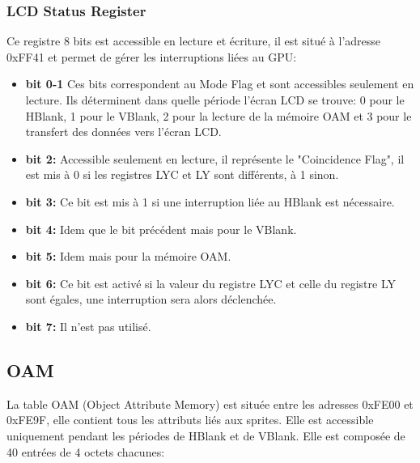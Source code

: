 \documentclass{report}
\begin{document}
\subsubsection{LCD Status Register}
Ce registre 8 bits est accessible en lecture et écriture, il est situé à l'adresse 0xFF41 et permet de gérer les interruptions liées au GPU:\\

\begin{itemize}
\item \textbf{bit 0-1}
	Ces bits correspondent au Mode Flag et sont accessibles seulement en lecture. Ils déterminent dans quelle période l'écran LCD se trouve: 0 pour le HBlank, 1 pour le VBlank, 2 pour la lecture de la mémoire OAM et 3 pour le transfert des données vers l'écran LCD.\\
\item \textbf{bit 2:}
	Accessible seulement en lecture, il représente le "Coincidence Flag", il est mis à 0 si les registres LYC et LY sont différents, à 1 sinon.\\
\item \textbf{bit 3:}
	Ce bit est mis à 1 si une interruption liée au HBlank est nécessaire.\\
\item \textbf{bit 4:} 
	Idem que le bit précédent mais pour le VBlank.\\
\item \textbf{bit 5:}
	Idem mais pour la mémoire OAM.\\
\item \textbf{bit 6:}
	Ce bit est activé si la valeur du registre LYC et celle du registre LY sont égales, une interruption sera alors déclenchée.\\
\item \textbf{bit 7:}
	Il n'est pas utilisé.\\
\end{itemize}

\subsection{OAM}
	La table OAM (Object Attribute Memory) est située entre les adresses 0xFE00 et 0xFE9F, elle contient tous les attributs liés aux sprites. Elle est accessible uniquement pendant les périodes de HBlank et de VBlank. Elle est composée de 40 entrées de 4 octets chacunes:\\
\end{document}
